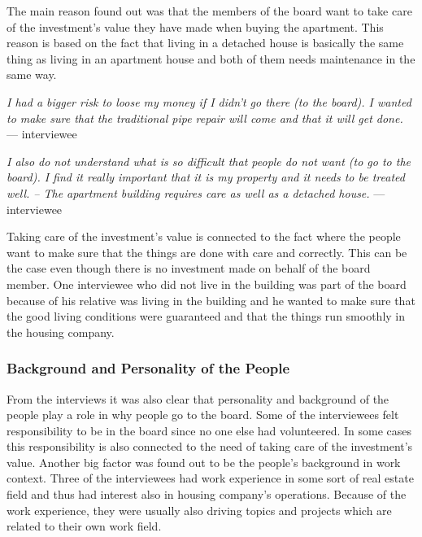 The main reason found out was that the members of the board want to take care of the investment's value they have made when buying the apartment. This reason is based on the fact that living in a detached house is basically the same thing as living in an apartment house and both of them needs maintenance in the same way.

\begin{displayquote}
\textit{I had a bigger risk to loose my money if I didn't go there (to the board). I wanted to make sure that the traditional pipe repair will come and that it will get done.} --- interviewee
\end{displayquote}

\begin{displayquote}
\textit{I also do not understand what is so difficult that people do not want (to go to the board). I find it really important that it is my property and it needs to be treated well. -- The apartment building requires care as well as a detached house.} --- interviewee
\end{displayquote}

Taking care of the investment's value is connected to the fact where the people want to make sure that the things are done with care and correctly. This can be the case even though there is no investment made on behalf of the board member. One interviewee who did not live in the building was part of the board because of his relative was living in the building and he wanted to make sure that the good living conditions were guaranteed and that the things run smoothly in the housing company.

\subsubsection*{Background and Personality of the People}

From the interviews it was also clear that personality and background of the people play a role in why people go to the board. Some of the interviewees felt responsibility to be in the board since no one else had volunteered. In some cases this responsibility is also connected to the need of taking care of the investment's value. Another big factor was found out to be the people's background in work context. Three of the interviewees had work experience in some sort of real estate field and thus had interest also in housing company's operations. Because of the work experience, they were usually also driving topics and projects which are related to their own work field.

